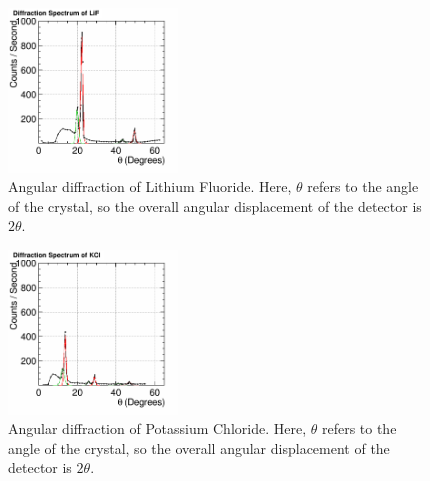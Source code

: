 \documentclass[%
 reprint,
 amsmath,amssymb,
 aps,
 pra,
]{revtex4-1}
\begin{document}
\begin{figure}[H]
	\centering
	\includegraphics[width=0.4\textwidth]{Diffraction_LiF.png}
	\caption{Angular diffraction of Lithium Fluoride. Here, $\theta$ refers to the angle of the crystal, so the overall angular displacement of the detector is $2 \theta$.}
	\label{fig:LiF}
\end{figure}

\begin{figure}[H]
	\centering
	\includegraphics[width=0.4\textwidth]{Diffraction_KCl.png}
	\caption{Angular diffraction of Potassium Chloride. Here, $\theta$ refers to the angle of the crystal, so the overall angular displacement of the detector is $2 \theta$.}
	\label{fig:KCl}
\end{figure}
\end{document}
